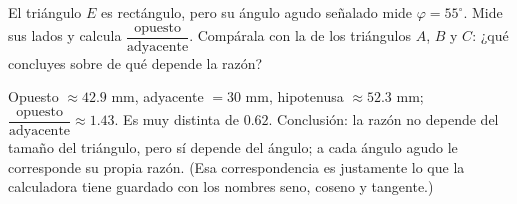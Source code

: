 \documentclass[11pt]{article}
\begin{document}
\begin{preguntas}
\pregunta[1] El triángulo $E$ es rectángulo, pero su ángulo agudo señalado mide
$\varphi = 55^\circ$. Mide sus lados y calcula
$\dfrac{\text{opuesto}}{\text{adyacente}}$. Compárala con la de los triángulos $A$, $B$ y
$C$: ¿qué concluyes sobre de qué depende la razón?

\begin{center}
\end{center}

\begin{solucion}[3.5cm]
Opuesto $\approx \num{42,9}$ mm, adyacente $= 30$ mm, hipotenusa $\approx \num{52,3}$ mm;
$\dfrac{\text{opuesto}}{\text{adyacente}} \approx \num{1,43}$. Es muy distinta de
$\num{0,62}$. Conclusión: la razón no depende del tamaño del triángulo, pero sí depende
del ángulo; a cada ángulo agudo le corresponde su propia razón. (Esa correspondencia es
justamente lo que la calculadora tiene guardado con los nombres seno, coseno y tangente.)
\end{solucion}

\end{preguntas}
\end{document}
